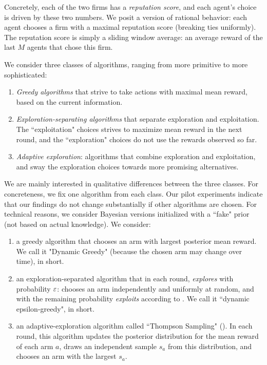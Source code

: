\documentclass[../competing_bandits.tex]{subfiles}
\begin{document}
Concretely, each of the two firms has a \emph{reputation score}, and each agent's choice is driven by these two numbers. We posit a version of rational behavior: each agent chooses a firm with a maximal reputation score (breaking ties uniformly). The reputation score is simply a sliding window average: an average reward of the last $M$ agents that chose this firm.


 We consider three classes of algorithms, ranging from more primitive to more sophisticated:

\begin{enumerate}
\item \emph{Greedy algorithms} that strive to take actions with maximal mean reward, based on the current information.

\item \emph{Exploration-separating algorithms} that separate exploration and exploitation. The ``exploitation" choices strives to maximize mean reward in the next round, and the ``exploration" choices do not use the rewards observed so far.
\item \emph{Adaptive exploration}: algorithms that combine exploration and exploitation, and sway the exploration choices towards more promising alternatives.
\end{enumerate}

We are mainly interested in qualitative differences between the three classes. For concreteness, we fix one algorithm from each class. Our pilot experiments indicate that our findings do not change substantially if other algorithms are chosen. For technical reasons, we consider Bayesian versions initialized with a ``fake" prior (\ie not based on actual knowledge). We consider:

\begin{enumerate}
\item a greedy algorithm that chooses an arm with largest posterior mean reward. We call it "Dynamic Greedy" (because the chosen arm may change over time), \DG in short.

\item an exploration-separated algorithm that in each round, \emph{explores} with probability $\varepsilon$: chooses an arm independently and uniformly at random, and with the remaining probability \emph{exploits} according to \DG. We call it ``dynamic epsilon-greedy", \DEG in short.

\item an adaptive-exploration algorithm called ``Thompson Sampling" (\TS). In each round, this algorithm updates the posterior distribution for the mean reward of each arm $a$, draws an independent sample $s_a$ from this distribution, and chooses an arm with the largest $s_a$.
\end{enumerate}
\end{document}
